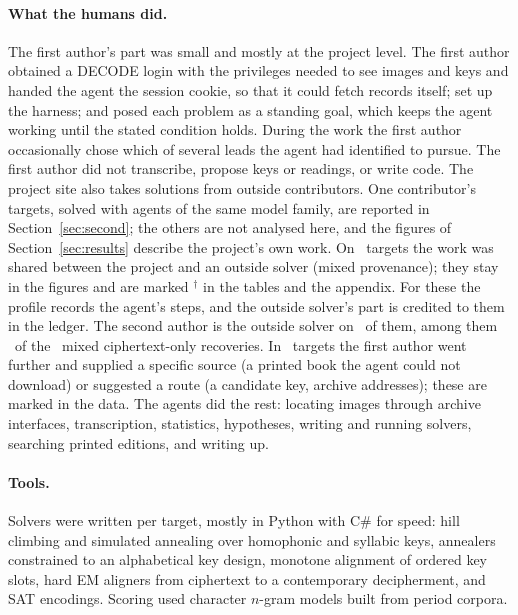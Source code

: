 \documentclass[11pt]{article}
\begin{document}
\paragraph{What the humans did.} The first author's part was small and mostly at the project level. The first author obtained a DECODE login with the privileges needed to see images and keys and handed the agent the session cookie, so that it could fetch records itself; set up the harness; and posed each problem as a standing goal, which keeps the agent working until the stated condition holds. During the work the first author occasionally chose which of several leads the agent had identified to pursue. The first author did not transcribe, propose keys or readings, or write code. The project site also takes solutions from outside contributors. One contributor's targets, solved with agents of the same model family, are reported in Section~\ref{sec:second}; the others are not analysed here, and the figures of Section~\ref{sec:results} describe the project's own work. On \Nexternal\ targets the work was shared between the project and an outside solver (mixed provenance); they stay in the figures and are marked $^\dagger$ in the tables and the appendix. For these the profile records the agent's steps, and the outside solver's part is credited to them in the ledger. The second author is the outside solver on \NmixedSA\ of them, among them \NmixedSACT\ of the \NmixedCT\ mixed ciphertext-only recoveries. In \Nhumaninput\ targets the first author went further and supplied a specific source (a printed book the agent could not download) or suggested a route (a candidate key, archive addresses); these are marked in the data. The agents did the rest: locating images through archive interfaces, transcription, statistics, hypotheses, writing and running solvers, searching printed editions, and writing up.

\paragraph{Tools.} Solvers were written per target, mostly in Python with C\# for speed: hill climbing and simulated annealing over homophonic and syllabic keys, annealers constrained to an alphabetical key design, monotone alignment of ordered key slots, hard EM aligners from ciphertext to a contemporary decipherment, and SAT encodings. Scoring used character $n$-gram models built from period corpora.
\end{document}
